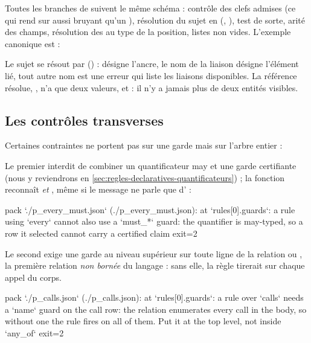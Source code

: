 Toutes les branches de  suivent le même schéma : contrôle des clefs admises (ce qui rend  sur  aussi bruyant qu'un ), résolution du sujet  en (, ), test de sorte, arité des champs, résolution des  au type de la position, listes non vides. L'exemple canonique est  :


Le sujet se résout par  () :  désigne l'ancre, le nom de la liaison  désigne l'élément lié, tout autre nom est une erreur qui liste les liaisons disponibles. La référence résolue, , n'a que deux valeurs,  et  : il n'y a jamais plus de deux entités visibles.

\subsection{Les contrôles transverses}

Certaines contraintes ne portent pas sur une garde mais sur l'arbre entier :


Le premier interdit de combiner un quantificateur may et une garde certifiante (nous y reviendrons en \cref{sec:regles-declaratives-quantificateurs}) ; la fonction  reconnaît  \emph{et} , même si le message ne parle que d' :

\begin{sortie}
[error] pack `./p_every_must.json` (./p_every_must.json): at `rules[0].guards`: a rule using `every` cannot also use a `must_*` guard: the quantifier is may-typed, so a row it selected cannot carry a certified claim
exit=2
\end{sortie}

Le second exige une garde  au niveau supérieur sur toute ligne de la relation  ou , la première relation \emph{non bornée} du langage : sans elle, la règle tirerait sur chaque appel du corps.

\begin{sortie}
[error] pack `./p_calls.json` (./p_calls.json): at `rules[0].guards`: a rule over `calls` needs a `name` guard on the call row: the relation enumerates every call in the body, so without one the rule fires on all of them. Put it at the top level, not inside `any_of`
exit=2
\end{sortie}

